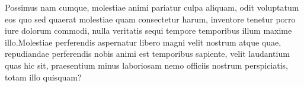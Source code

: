 \documentclass[letterpaper]{article} %
\begin{document}

Possimus nam cumque, molestiae animi pariatur culpa aliquam, odit voluptatum eos quo sed quaerat molestiae quam consectetur harum, inventore tenetur porro iure dolorum commodi, nulla veritatis sequi tempore temporibus illum maxime illo.Molestiae perferendis aspernatur libero magni velit nostrum atque quae, repudiandae perferendis nobis animi est temporibus sapiente, velit laudantium quas hic sit, praesentium minus laboriosam nemo officiis nostrum perspiciatis, totam illo quisquam?\clearpage

\end{document}
